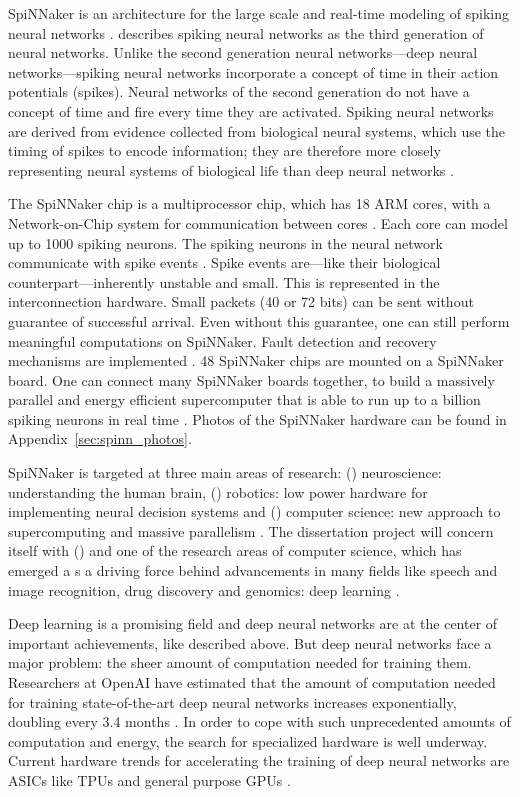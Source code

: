 \documentclass{article}
\begin{document}
SpiNNaker is an architecture for the large scale and
real-time modeling of spiking neural networks
\citep{furber_et_al_2006, furber_et_al_2006b,
  furber_et_al_2007}.
\citet{maass1997} describes spiking neural networks as the
third generation of neural networks.
Unlike the second generation neural networks---deep neural
networks---spiking neural networks incorporate a concept of time in
their action potentials (spikes).
Neural networks of the second generation do not have a
concept of time and fire every time they are activated.
Spiking neural networks are derived from evidence
collected from biological neural systems, which use the timing of
spikes to encode information; they are therefore more closely
representing neural systems of biological life than deep
neural networks \citep{maass1997}.

The SpiNNaker chip is a multiprocessor chip, which has 18 ARM
cores, with a Network-on-Chip system for
communication between cores \citep{furber_et_al_2007,
  spinn_proj}.
Each core can model up to 1000 spiking neurons.
The spiking neurons in the neural network communicate with
spike events \citep{furber_et_al_2007}.
Spike events are---like their biological
counterpart---inherently unstable and small.
This is represented in the interconnection hardware.
Small packets (40 or 72 bits) can be sent without
guarantee of successful arrival.
Even without this guarantee, one can still perform
meaningful computations on SpiNNaker.
Fault detection and recovery mechanisms are implemented
\citep{spinn_proj}.
48 SpiNNaker chips are mounted on a SpiNNaker board.
One can connect many SpiNNaker boards together, to build a
massively parallel and energy efficient supercomputer that
is able to run up to a billion spiking neurons in real time
\citep{furber_et_al_2007}.
Photos of the SpiNNaker hardware can be found in
Appendix~\ref{sec:spinn_photos}.

SpiNNaker is targeted at three main areas of research:
() neuroscience: understanding the human
brain, () robotics: low power hardware for
implementing neural decision systems and
() computer science: new approach to
supercomputing and massive parallelism \citep{spinn_proj}.
The dissertation project will concern itself with ()
and one of the research areas of computer science, which has emerged a
s a driving force behind advancements in many fields like speech and
image recognition, drug discovery and genomics:
deep learning \citep{lecun_et_al_2015}.

Deep learning is a promising field and deep neural
networks are at the center of important achievements, like described
above.
But deep neural networks face a major problem: the sheer
amount of computation needed for training them.
Researchers at OpenAI have estimated that the amount of
computation needed for training state-of-the-art deep
neural networks increases exponentially, doubling every
3.4 months \citep{openai2019}.
In order to cope with such unprecedented amounts of
computation and energy, the search for specialized hardware is well
underway.
Current hardware trends for accelerating the training of deep neural
networks are ASICs like TPUs and general purpose GPUs
\citep{tpus, mittal_et_al_2019}.
\end{document}
